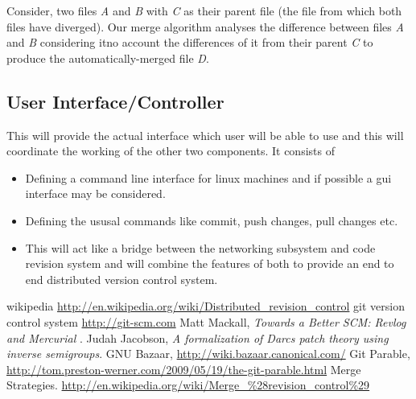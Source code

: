 \documentclass[]{article}
\begin{document}
Consider, two files \emph{A} and \emph{B} with \emph{C} as their parent file (the file from which both files have diverged). Our merge algorithm analyses the difference between files \emph{A} and \emph{B} considering itno account the differences of it from their parent \emph{C} to produce the automatically-merged file \emph{D}. 

\subsection{User Interface/Controller}
This will provide the actual interface which user will be able to use and this
will coordinate the working of the other two components.
It consists of
\begin{itemize}
\item Defining a command line interface for linux machines and if possible a
  gui interface may be considered.
\item Defining the ususal commands like commit, push changes, pull changes
  etc.
\item This will act like a bridge between the networking subsystem and code
  revision system and will combine the features of both to provide an end to
  end distributed version control system.
\end{itemize}

\begin{thebibliography}{99}
wikipedia \url{http://en.wikipedia.org/wiki/Distributed_revision_control}
git version control system \url{http://git-scm.com}
Matt Mackall, \emph{Towards a Better SCM: Revlog and Mercurial} .
Judah Jacobson, \emph{A formalization of Darcs patch theory using inverse
  semigroups}.
GNU Bazaar, \url{http://wiki.bazaar.canonical.com/}
Git Parable, \url{http://tom.preston-werner.com/2009/05/19/the-git-parable.html}
Merge Strategies.
\url{http://en.wikipedia.org/wiki/Merge_%28revision_control%29}
\end{thebibliography}
\end{document}
